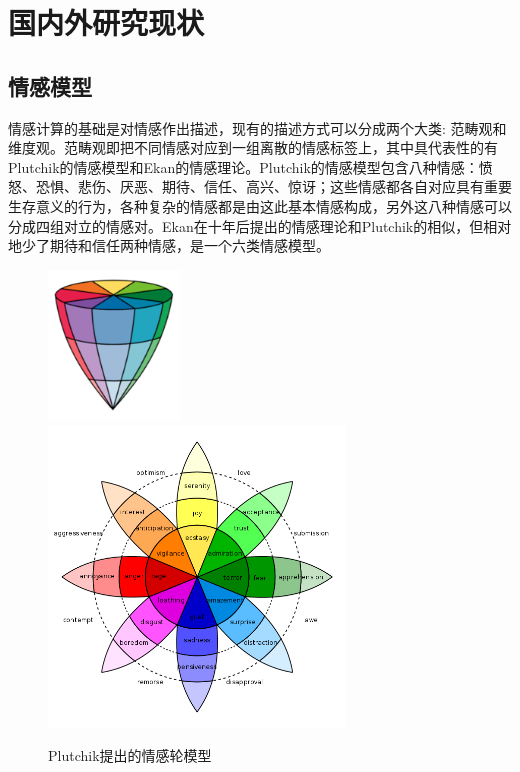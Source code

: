 \section{国内外研究现状}

\subsection{情感模型}

情感计算的基础是对情感作出描述，现有的描述方式可以分成两个大类: 范畴观和维度观。范畴观即把不同情感对应到一组离散的情感标签上，其中具代表性的有Plutchik的情感模型\cite{Plutchik1980Emo}和Ekan的情感理论\cite{Ekman1992An}。Plutchik的情感模型包含八种情感：愤怒、恐惧、悲伤、厌恶、期待、信任、高兴、惊讶；这些情感都各自对应具有重要生存意义的行为，各种复杂的情感都是由这此基本情感构成，另外这八种情感可以分成四组对立的情感对。Ekan在十年后提出的情感理论和Plutchik的相似，但相对地少了期待和信任两种情感，是一个六类情感模型。

\begin{figure}[h]
  \centering%
    {\includegraphics[height=4cm]{img/plutchik_3d.png}}%
  \hspace{4em}%
      {\includegraphics[height=8cm]{img/plutchik_2d.png}}
  \caption{Plutchik\cite{Plutchik1980Emo}提出的情感轮模型}
  \label{fig:plutchik_emotion_wheel}
\end{figure}

